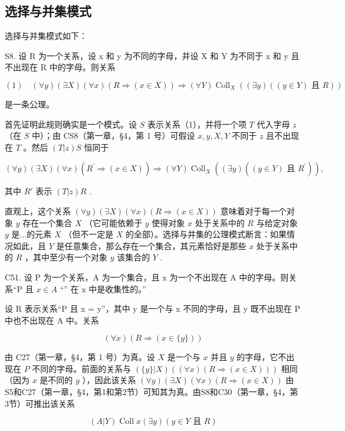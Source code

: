 \subsection{选择与并集模式}

选择与并集模式如下：

S8. 设 R 为一个关系，设 x 和 y 为不同的字母，并设 X 和 Y 为不同于 x 和 y 且不出现在 R 中的字母。则关系

\[
(1) \quad (\forall y) (\exists X) (\forall x) (R \Longrightarrow (x \in X)) \Longrightarrow (\forall Y) \operatorname{Coll} _ {X} ((\exists y) ((y \in Y) \text {   且   } R))
\]

是一条公理。

首先证明此规则确实是一个模式。设 \(S\) 表示关系（1），并将一个项 \(T\) 代入字母 \(z\) （在 \(S\) 中）；由 CS8（第一章，§4，第 1 号）可假设 \(x, y, X, Y\) 不同于 \(z\) 且不出现在 \(T\) 。然后 \((T|z)S\) 恒同于

\[
(\forall y) (\exists X) (\forall x) (R ^ {\prime} \Longrightarrow (x \in X)) \Longrightarrow (\forall Y) \operatorname{Coll} _ {X} ((\exists y) ((y \in Y) \text {   且   } R ^ {\prime})),
\]

其中 \(R'\) 表示 \((T|z)R\) .

直观上，这个关系 \((\forall y)(\exists X)(\forall x)(R \Rightarrow (x \in X))\) 意味着对于每一个对象 \(y\) 存在一个集合 \(X\) （它可能依赖于 \(y\) 使得对象 \(x\) 处于关系中的 \(R\) 与给定对象 \(y\) 是...的元素 \(X\) （但不一定是 \(X\) 的全部）。选择与并集的公理模式断言：如果情况如此，且 \(Y\) 是任意集合，那么存在一个集合，其元素恰好是那些 \(x\) 处于关系中的 \(R\) ，其中至少有一个对象 \(y\) 该集合的 \(Y\) .

C51. 设 P 为一个关系，A 为一个集合，且 x 为一个不出现在 A 中的字母。则关系“P 且 \(x \in A\) “'' 在 x 中是收集性的。”

设 R 表示关系“P 且 x = y”，其中 y 是一个与 x 不同的字母，且 y 既不出现在 P 中也不出现在 A 中。关系

\[
(\forall x) (R \Longrightarrow (x \in \{y \}))
\]

由 C27（第一章，§4，第 1 号）为真。设 \(X\) 是一个与 \(x\) 并且 \(y\) 的字母，它不出现在 \(P\) 不同的字母。前面的关系与 \((\{y\}|X)((\forall x)(R \Longrightarrow (x \in X)))\) 相同（因为 \(x\) 是不同的 \(y\) ），因此该关系 \((\forall y)(\exists X)(\forall x)(R \Longrightarrow (x \in X))\) 由S5和C27（第一章，§4，第1和第2节）可知其为真。由S8和C30（第一章，§4，第3节）可推出该关系

\[
(A | Y) \operatorname{Coll} x (\exists y) (y \in Y \text {   且   } R)
\]

